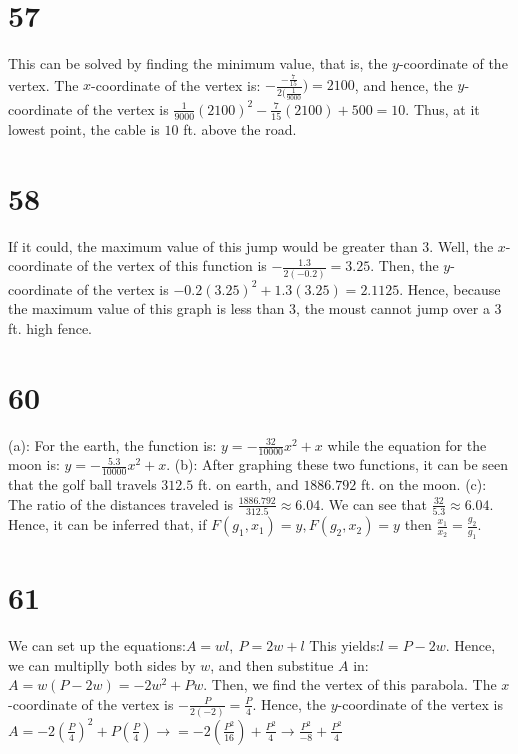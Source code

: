 \documentclass{article}
\theoremstyle{definition}
\begin{document}
\section*{57}
This can be solved by finding the minimum value, that is, the $y$-coordinate of the vertex. The $x$-coordinate of the vertex is:\newline
$-\frac{-\frac{7}{15}}{2(\frac{1}{9000}})=2100$, and hence, the $y$-coordinate of the vertex is $\frac{1}{9000}(2100)^2-\frac{7}{15}(2100)+500=10$. Thus, at it lowest point, 
the cable is $10$ ft. above the road.

\section*{58}
If it could, the maximum value of this jump would be greater than $3$. Well, the $x$-coordinate of the vertex of this function is $-\frac{1.3}{2(-0.2)}=3.25$. Then, the 
$y$-coordinate of the vertex is $-0.2(3.25)^2+1.3(3.25)=2.1125$. Hence, because the maximum value of this graph is less than $3$, the moust cannot jump over a $3$ ft. high 
fence.

\section*{60}
(a): For the earth, the function is: $y=-\frac{32}{10000}x^2+x$ while the equation for the moon is: $y=-\frac{5.3}{10000}x^2+x$.\newline
(b): After graphing these two functions, it can be seen that the golf ball travels $312.5$ ft. on earth, and $1886.792$ ft. on the moon.
(c): The ratio of the distances traveled is $\frac{1886.792}{312.5}\approx 6.04$. We can see that $\frac{32}{5.3}\approx 6.04$. Hence, it can be inferred that, if $F(g_1, x_1)=y, 
F(g_2, x_2)=y$ then $\frac{x_1}{x_2}=\frac{g_2}{g_1}$.

\section*{61}
We can set up the equations:\newline $A=wl,\ P=2w+l$ This yields:\newline $l=P-2w$. Hence, we can multiplly both sides by $w$, and then substitue $A$ in:\newline
$A=w(P-2w)=-2w^2+Pw$. Then, we find the vertex of this parabola. The $x$-coordinate of the vertex is $-\frac{P}{2(-2)}=\frac{P}{4}$. Hence, the $y$-coordinate of the vertex 
is $A=-2(\frac{P}{4})^2+P(\frac{P}{4})$\newline$\rightarrow =-2(\frac{P^2}{16})+\frac{P^2}{4}$\newline $\rightarrow \frac{P^2}{-8}+\frac{P^2}{4}$\newline 
\end{document}
